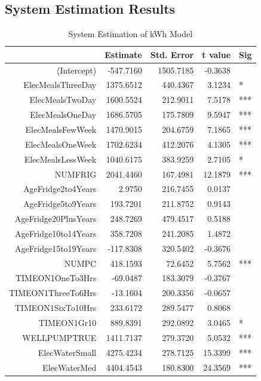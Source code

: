 \documentclass{article}
\begin{document}
\subsection{System Estimation Results}
{\small
\begin{longtable}{rrrrl}
\caption{System Estimation of kWh Model} \\ 
  \hline
 & Estimate & Std. Error & t value & Sig \\ 
  \hline
(Intercept) & -547.7160 & 1505.7185 & -0.3638 &   \\ 
  ElecMealsThreeDay & 1375.6512 & 440.4367 & 3.1234 & * \\ 
  ElecMealsTwoDay & 1600.5524 & 212.9011 & 7.5178 & *** \\ 
  ElecMealsOneDay & 1686.5705 & 175.7809 & 9.5947 & *** \\ 
  ElecMealsFewWeek & 1470.9015 & 204.6759 & 7.1865 & *** \\ 
  ElecMealsOneWeek & 1702.6234 & 412.2076 & 4.1305 & *** \\ 
  ElecMealsLessWeek & 1040.6175 & 383.9259 & 2.7105 & * \\ 
  NUMFRIG & 2041.4460 & 167.4981 & 12.1879 & *** \\ 
  AgeFridge2to4Years & 2.9750 & 216.7455 & 0.0137 &   \\ 
  AgeFridge5to9Years & 193.7201 & 211.8752 & 0.9143 &   \\ 
  AgeFridge20PlusYears & 248.7269 & 479.4517 & 0.5188 &   \\ 
  AgeFridge10to14Years & 358.7208 & 241.2085 & 1.4872 &   \\ 
  AgeFridge15to19Years & -117.8308 & 320.5402 & -0.3676 &   \\ 
  NUMPC & 418.1593 & 72.6452 & 5.7562 & *** \\ 
  TIMEON1OneTo3Hrs & -69.0487 & 183.3079 & -0.3767 &   \\ 
  TIMEON1ThreeTo6Hrs & -13.1604 & 200.3356 & -0.0657 &   \\ 
  TIMEON1SixTo10Hrs & 233.6172 & 289.5477 & 0.8068 &   \\ 
  TIMEON1Gr10 & 889.8391 & 292.0892 & 3.0465 & * \\ 
  WELLPUMPTRUE & 1411.7137 & 279.3720 & 5.0532 & *** \\ 
  ElecWaterSmall & 4275.4234 & 278.7125 & 15.3399 & *** \\ 
  ElecWaterMed & 4404.4543 & 180.8300 & 24.3569 & *** \\ 

\end{longtable}}
\end{document}
